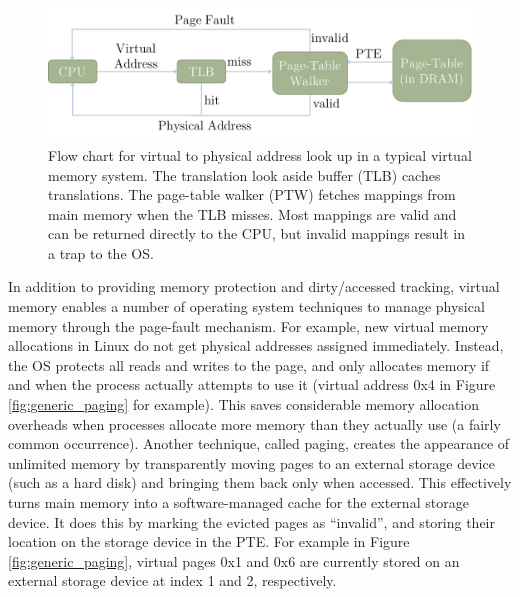 \begin{figure}[h]
    \centering
    \includegraphics[width=0.9\columnwidth]{figs/generic_paging.pdf}
    \vspace{-5mm}
    \caption{Flow chart for virtual to physical address look up in a typical virtual memory system. The translation look aside buffer (TLB) caches translations. The page-table walker (PTW) fetches mappings from main memory when the TLB misses. Most mappings are valid and can be returned directly to the CPU, but invalid mappings result in a trap to the OS.}
    \label{fig:generic_paging_flow}
\end{figure}

In addition to providing memory protection and dirty/accessed tracking, virtual
memory enables a number of operating system techniques to manage physical
memory through the page-fault mechanism. For example, new virtual memory
allocations in Linux do not get physical addresses assigned immediately.
Instead, the OS protects all reads and writes to the page, and only allocates
memory if and when the process actually attempts to use it (virtual address 0x4
in Figure \ref{fig:generic_paging} for example). This saves considerable memory
allocation overheads when processes allocate more memory than they actually use
(a fairly common occurrence). Another technique, called paging, creates the
appearance of unlimited memory by transparently moving pages to an external
storage device (such as a hard disk) and bringing them back only when accessed.
This effectively turns main memory into a software-managed cache for the
external storage device. It does this by marking the evicted pages as
``invalid'', and storing their location on the storage device in the PTE. For
example in Figure \ref{fig:generic_paging}, virtual pages 0x1 and 0x6 are
currently stored on an external storage device at index 1 and 2, respectively.
